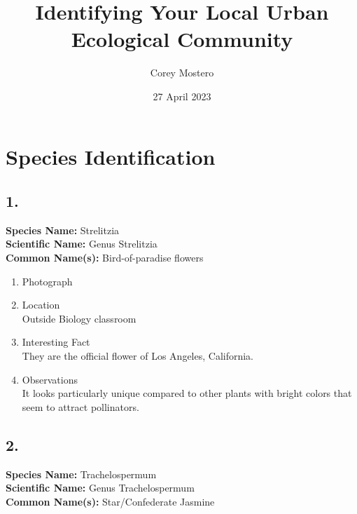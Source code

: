 \documentclass{article}
\title{Identifying Your Local Urban Ecological Community}
\author{Corey Mostero}
\date{27 April 2023}
\begin{document}
\newcommand{\hr}{\par\noindent\rule{\textwidth}{0.4pt}}

\newcommand{\bc}[1]{
	\begin{equation*}
		\begin{boxed}
			{#1}
		\end{boxed}
	\end{equation*}
}

\newcommand{\cond}[2]{
	\ifmmode
		{#1} \quad {#2}
	\else
		$$ {#1} \quad {#2} $$
	\fi
}

\maketitle
\newpage

\tableofcontents

\section{Species Identification}

\subsection{1.}
\textbf{Species Name: } Strelitzia \\
\textbf{Scientific Name: } Genus Strelitzia \\
\textbf{Common Name(s): } Bird-of-paradise flowers

\begin{enumerate}[label = \textbf{\arabic*)}]
	\item Photograph
	\item Location \\
		Outside Biology classroom
	\item Interesting Fact \\
		They are the official flower of Los Angeles, California.
	\item Observations \\
		It looks particularly unique compared to other plants with bright colors that seem to attract pollinators.
\end{enumerate}

\subsection{2.}
\textbf{Species Name: } Trachelospermum \\
\textbf{Scientific Name: } Genus Trachelospermum \\
\textbf{Common Name(s): } Star/Confederate Jasmine
\end{document}
